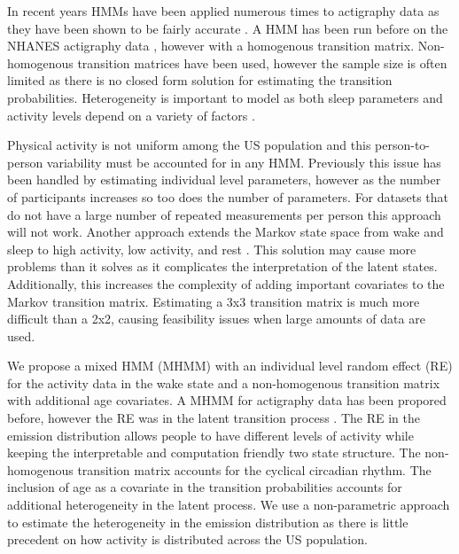 \documentclass{article}
\begin{document}
In recent years HMMs have been applied numerous times to actigraphy data \cite{Liu2020a,Boeker2021} as they have been shown to be fairly accurate \cite{Li2020,Witowski2014}. A HMM has been run before on the NHANES actigraphy data \cite{Xu2022,Su2022}, however with a homogenous transition matrix. Non-homogenous transition matrices have been used, however the sample size is often limited \cite{Ogbagaber2024,Huang2018a} as there is no closed form solution for estimating the transition probabilities. Heterogeneity is important to model as both sleep parameters and activity levels depend on a variety of factors \cite{etindele2022,Salvo2015,mitchell2017}. 

Physical activity is not uniform among the US population \cite{hootman2003} and this person-to-person variability must be accounted for in any HMM. Previously this issue has been handled by estimating individual level parameters, however as the number of participants increases so too does the number of parameters. For datasets that do not have a large number of repeated measurements per person this approach will not work. Another approach extends the Markov state space from wake and sleep to high activity, low activity, and rest \cite{Huang2018a,Boeker2021}. This solution may cause more problems than it solves as it complicates the interpretation of the latent states. Additionally, this increases the complexity of adding important covariates to the Markov transition matrix. Estimating a 3x3 transition matrix is much more difficult than a 2x2, causing feasibility issues when large amounts of data are used. 

We propose a mixed HMM (MHMM) \cite{altmanMixedHiddenMarkov2007, maruotti2009,maruottiMixedHiddenMarkov2011} with an individual level random effect (RE) for the activity data in the wake state and a non-homogenous transition matrix with additional age covariates. A MHMM for actigraphy data has been propored before, however the RE was in the latent transition process \cite{Duroy2020}. The RE in the emission distribution allows people to have different levels of activity while keeping the interpretable and computation friendly two state structure. The non-homogenous transition matrix accounts for the cyclical circadian rhythm. The inclusion of age as a covariate in the transition probabilities accounts for additional heterogeneity in the latent process. We use a non-parametric approach to estimate the heterogeneity in the emission distribution as there is little precedent on how activity is distributed across the US population.
\end{document}
